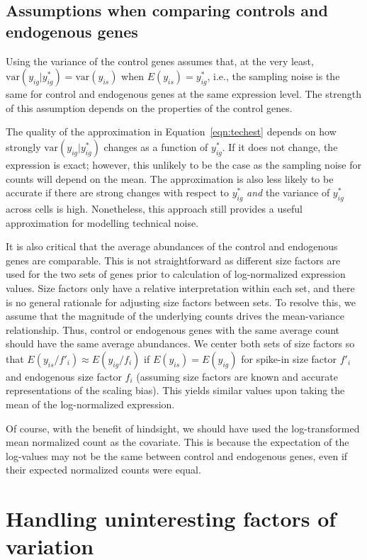 \documentclass{article}
\begin{document}
\subsection{Assumptions when comparing controls and endogenous genes}
Using the variance of the control genes assumes that, at the very least, $\mbox{var}(y_{ig}|y_{ig}^*) = \mbox{var}(y_{is})$ when $E(y_{is}) = y_{ig}^*$, 
i.e., the sampling noise is the same for control and endogenous genes at the same expression level.
The strength of this assumption depends on the properties of the control genes.

The quality of the approximation in Equation~\ref{eqn:techest} depends on how strongly $\mbox{var}(y_{ig}|y_{ig}^*)$ changes as a function of $y^*_{ig}$.
If it does not change, the expression is exact; however, this unlikely to be the case as the sampling noise for counts will depend on the mean.
The approximation is also less likely to be accurate if there are strong changes with respect to $y_{ig}^*$ \textit{and} the variance of $y_{ig}^*$ across cells is high.
Nonetheless, this approach still provides a useful approximation for modelling technical noise.

It is also critical that the average abundances of the control and endogenous genes are comparable.
This is not straightforward as different size factors are used for the two sets of genes prior to calculation of log-normalized expression values.
Size factors only have a relative interpretation within each set, and there is no general rationale for adjusting size factors between sets.
To resolve this, we assume that the magnitude of the underlying counts drives the mean-variance relationship.
Thus, control or endogenous genes with the same average count should have the same average abundances.
We center both sets of size factors so that $E(y_{is}/f'_i) \approx E(y_{ig}/f_i)$ if $E(y_{is})=E(y_{ig})$ for spike-in size factor $f'_i$ and endogenous size factor $f_i$ (assuming size factors are known and accurate representations of the scaling bias).
This yields similar values upon taking the mean of the log-normalized expression.

Of course, with the benefit of hindsight, we should have used the log-transformed mean normalized count as the covariate.
This is because the expectation of the log-values may not be the same between control and endogenous genes, even if their expected normalized counts were equal.

\section{Handling uninteresting factors of variation}
\end{document}

